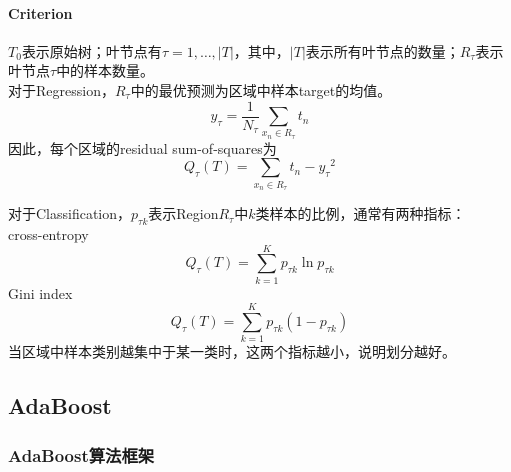 \documentclass[a4paper]{article}
\begin{document}
\paragraph{Criterion}$T_0$表示原始树；叶节点有$\tau=1,\dots,|T|$，其中，$|T|$表示所有叶节点的数量；$R_\tau$表示叶节点$\tau$中的样本数量。\\
对于Regression，$R_\tau$中的最优预测为区域中样本target的均值。
\begin{equation}
  y_\tau=\frac{1}{N_\tau}\sum_{x_n \in R_\tau} t_n
\end{equation}
因此，每个区域的residual sum-of-squares为
\begin{equation}
  Q_\tau(T)=\sum_{x_n \in R_\tau}{t_n-y_\tau}^2
\end{equation}

对于Classification，$p_{\tau k}$表示Region$R_\tau$中$k$类样本的比例，通常有两种指标：\\
cross-entropy
\begin{equation}
  Q_\tau(T)=\sum_{k=1}^{K}p_{\tau k}\ln p_{\tau k}
\end{equation}
Gini index
\begin{equation}
  Q_\tau(T)=\sum_{k=1}^{K}p_{\tau k}(1-p_{\tau k})
\end{equation}
当区域中样本类别越集中于某一类时，这两个指标越小，说明划分越好。

\subsection{AdaBoost}
\subsubsection{AdaBoost算法框架}
\end{document}
